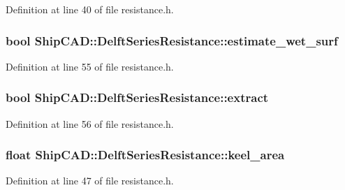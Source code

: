 Definition at line 40 of file resistance.\-h.

\hypertarget{structShipCAD_1_1DelftSeriesResistance_a0507b03a9329185d961cd97739237d91}{
\subsubsection[{estimate\-\_\-wet\-\_\-surf}]{\setlength{\rightskip}{0pt plus 5cm}bool Ship\-C\-A\-D\-::\-Delft\-Series\-Resistance\-::estimate\-\_\-wet\-\_\-surf}}\label{structShipCAD_1_1DelftSeriesResistance_a0507b03a9329185d961cd97739237d91}


Definition at line 55 of file resistance.\-h.

\hypertarget{structShipCAD_1_1DelftSeriesResistance_a8276aa04952e727f1a310f10ceb72414}{
\subsubsection[{extract}]{\setlength{\rightskip}{0pt plus 5cm}bool Ship\-C\-A\-D\-::\-Delft\-Series\-Resistance\-::extract}}\label{structShipCAD_1_1DelftSeriesResistance_a8276aa04952e727f1a310f10ceb72414}


Definition at line 56 of file resistance.\-h.

\hypertarget{structShipCAD_1_1DelftSeriesResistance_ab1bf49519c2ed054b7699898d7f5aead}{
\subsubsection[{keel\-\_\-area}]{\setlength{\rightskip}{0pt plus 5cm}float Ship\-C\-A\-D\-::\-Delft\-Series\-Resistance\-::keel\-\_\-area}}\label{structShipCAD_1_1DelftSeriesResistance_ab1bf49519c2ed054b7699898d7f5aead}


Definition at line 47 of file resistance.\-h.

